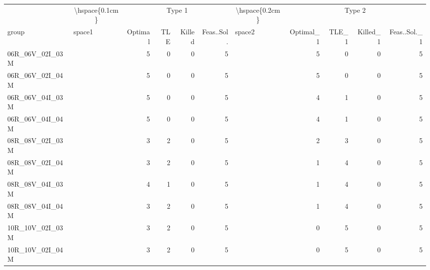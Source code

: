 
\begin{tabular}{llrrrrlrrrr}
\toprule
\multicolumn{1}{c}{} & \multicolumn{1}{c}{\textbackslash{}hspace\{0.1cm\}} & \multicolumn{4}{c}{Type 1} & \multicolumn{1}{c}{\textbackslash{}hspace\{0.2cm\}} & \multicolumn{4}{c}{Type 2} \\
\cmidrule(l{3pt}r{3pt}){2-2} \cmidrule(l{3pt}r{3pt}){3-6} \cmidrule(l{3pt}r{3pt}){7-7} \cmidrule(l{3pt}r{3pt}){8-11}
group & space1 & Optimal & TLE & Killed & Feas..Sol. & space2 & Optimal\_1 & TLE\_1 & Killed\_1 & Feas..Sol.\_1\\
\midrule
06R\_06V\_02I\_03M & \hspace{0.1cm} & 5 & 0 & 0 & 5 & \hspace{0.2cm} & 5 & 0 & 0 & 5\\
06R\_06V\_02I\_04M & \hspace{0.1cm} & 5 & 0 & 0 & 5 & \hspace{0.2cm} & 5 & 0 & 0 & 5\\
06R\_06V\_04I\_03M & \hspace{0.1cm} & 5 & 0 & 0 & 5 & \hspace{0.2cm} & 4 & 1 & 0 & 5\\
06R\_06V\_04I\_04M & \hspace{0.1cm} & 5 & 0 & 0 & 5 & \hspace{0.2cm} & 4 & 1 & 0 & 5\\
\addlinespace
08R\_08V\_02I\_03M & \hspace{0.1cm} & 3 & 2 & 0 & 5 & \hspace{0.2cm} & 2 & 3 & 0 & 5\\
08R\_08V\_02I\_04M & \hspace{0.1cm} & 3 & 2 & 0 & 5 & \hspace{0.2cm} & 1 & 4 & 0 & 5\\
08R\_08V\_04I\_03M & \hspace{0.1cm} & 4 & 1 & 0 & 5 & \hspace{0.2cm} & 1 & 4 & 0 & 5\\
08R\_08V\_04I\_04M & \hspace{0.1cm} & 3 & 2 & 0 & 5 & \hspace{0.2cm} & 1 & 4 & 0 & 5\\
\addlinespace
10R\_10V\_02I\_03M & \hspace{0.1cm} & 3 & 2 & 0 & 5 & \hspace{0.2cm} & 0 & 5 & 0 & 5\\
10R\_10V\_02I\_04M & \hspace{0.1cm} & 3 & 2 & 0 & 5 & \hspace{0.2cm} & 0 & 5 & 0 & 5\\

\end{tabular}
